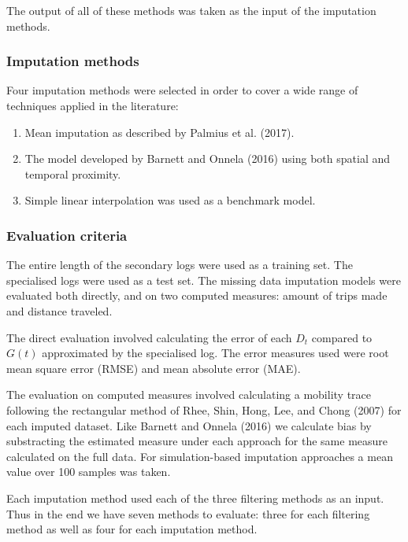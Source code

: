\documentclass[english,man]{apa6}
\providecommand{\tightlist}{%
  \setlength{\itemsep}{0pt}\setlength{\parskip}{0pt}}
\theoremstyle{definition}
\theoremstyle{definition}
\theoremstyle{definition}
\theoremstyle{remark}
\begin{document}
The output of all of these methods was taken as the input of the
imputation methods.

\subsubsection{Imputation methods}\label{imputation-methods}

Four imputation methods were selected in order to cover a wide range of
techniques applied in the literature:

\begin{enumerate}
\def\labelenumi{\arabic{enumi}.}
\tightlist
\item
  Mean imputation as described by Palmius et al. (2017).
\item
  The model developed by Barnett and Onnela (2016) using both spatial
  and temporal proximity.
\item
  Simple linear interpolation was used as a benchmark model.
\end{enumerate}

\subsubsection{Evaluation criteria}\label{evaluation-criteria}

The entire length of the secondary logs were used as a training set. The
specialised logs were used as a test set. The missing data imputation
models were evaluated both directly, and on two computed measures:
amount of trips made and distance traveled.

The direct evaluation involved calculating the error of each \(D_t\)
compared to \(G(t)\) approximated by the specialised log. The error
measures used were root mean square error (RMSE) and mean absolute error
(MAE).

The evaluation on computed measures involved calculating a mobility
trace following the rectangular method of Rhee, Shin, Hong, Lee, and
Chong (2007) for each imputed dataset. Like Barnett and Onnela (2016) we
calculate bias by substracting the estimated measure under each approach
for the same measure calculated on the full data. For simulation-based
imputation approaches a mean value over 100 samples was taken.

Each imputation method used each of the three filtering methods as an
input. Thus in the end we have seven methods to evaluate: three
for each filtering method as well as four for each imputation method.
\end{document}
